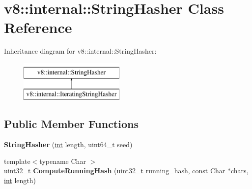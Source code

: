 \hypertarget{classv8_1_1internal_1_1StringHasher}{}\section{v8\+:\+:internal\+:\+:String\+Hasher Class Reference}
\label{classv8_1_1internal_1_1StringHasher}
Inheritance diagram for v8\+:\+:internal\+:\+:String\+Hasher\+:\begin{figure}[H]
\begin{center}
\leavevmode
\includegraphics[height=2.000000cm]{classv8_1_1internal_1_1StringHasher}
\end{center}
\end{figure}
\subsection*{Public Member Functions}
\begin{DoxyCompactItemize}
\item 
\mbox{\label{classv8_1_1internal_1_1StringHasher_a80ba767b1133dcdb810b056e5806258b}} 
{\bfseries String\+Hasher} (\mbox{\hyperlink{classint}{int}} length, uint64\+\_\+t seed)
\item 
\mbox{\label{classv8_1_1internal_1_1StringHasher_ac2a82adf1dd4c453aaeb76c6f19f5b86}} 
{\footnotesize template$<$typename Char $>$ }\\\mbox{\hyperlink{classuint32__t}{uint32\+\_\+t}} {\bfseries Compute\+Running\+Hash} (\mbox{\hyperlink{classuint32__t}{uint32\+\_\+t}} running\+\_\+hash, const Char $\ast$chars, \mbox{\hyperlink{classint}{int}} length)
\end{DoxyCompactItemize}
